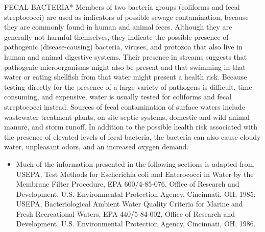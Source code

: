\documentclass{article}
\begin{document}
FECAL BACTERIA* Members of two bacteria groups (coliforms and fecal
streptococci) are used as indicators of possible sewage contamination,
because they are commonly found in human and animal feces. Although they
are generally not harmful themselves, they indicate the possible
presence of pathogenic (disease-causing) bacteria, viruses, and protozoa
that also live in human and animal digestive systems. Their presence in
streams suggests that pathogenic microorganisms might also be present
and that swimming in that water or eating shellfish from that water
might present a health risk. Because testing directly for the presence
of a large variety of pathogens is difficult, time consuming, and
expensive, water is usually tested for coliforms and fecal streptococci
instead. Sources of fecal contamination of surface waters include
wastewater treatment plants, on-site septic systems, domestic and wild
animal manure, and storm runoff. In addition to the possible health risk
associated with the presence of elevated levels of fecal bacteria, the
bacteria can also cause cloudy water, unpleasant odors, and an increased
oxygen demand.

\begin{itemize}
\item
  Much of the information presented in the following sections is adapted
  from USEPA, Test Methods for Escherichia coli and Enterococci in Water
  by the Membrane Filter Procedure, EPA 600/4-85-076, Office of Research
  and Development, U.S. Environmental Protection Agency, Cincinnati, OH,
  1985; USEPA, Bacteriological Ambient Water Quality Criteria for Marine
  and Fresh Recreational Waters, EPA 440/5-84-002, Office of Research
  and Development, U.S. Environmental Protection Agency, Cincinnati, OH,
  1986.
\end{itemize}
\end{document}
